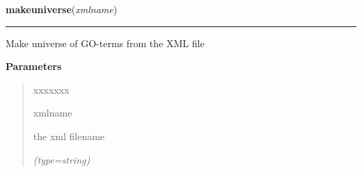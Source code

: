     \label{EveryGO:makeuniverse}

    \vspace{0.5ex}

\hspace{.8\funcindent}\begin{boxedminipage}{\funcwidth}

    \raggedright \textbf{makeuniverse}(\textit{xmlname})

    \vspace{-1.5ex}

    \rule{\textwidth}{0.5\fboxrule}
\setlength{\parskip}{2ex}
    Make universe of GO-terms from the XML file

\setlength{\parskip}{1ex}
      \textbf{Parameters}
      \vspace{-1ex}

      \begin{quote}
        \begin{Ventry}{xxxxxxx}

          \item[xmlname]

          the xml filename

            {\it (type=string)}

        \end{Ventry}

      \end{quote}

    \end{boxedminipage}

    \label{EveryGO:everygo}

    \vspace{0.5ex}

